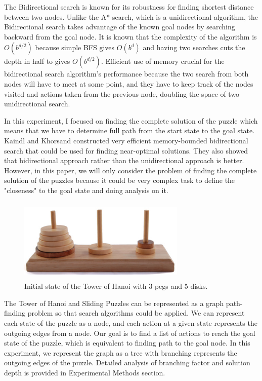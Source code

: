 \documentclass[conference]{IEEEtran}
\begin{document}
The Bidirectional search is known for its robustness for finding shortest distance between two nodes. Unlike the A* search, which is a unidirectional algorithm, the Bidirectional search takes advantage of the known goal nodes by searching backward from the goal node. It is known that the complexity of the algorithm is $O(b^{d/2})$ because simple BFS gives $O(b^d)$ and having two searches cuts the depth in half to gives $O(b^{d/2})$. Efficient use of memory crucial for the bidirectional search algorithm's performance because the two search from both nodes will have to meet at some point, and they have to keep track of the nodes visited and actions taken from the previous node, doubling the space of two unidirectional search.

In this experiment, I focused on finding the complete solution of the puzzle which means that we have to determine full path from the start state to the goal state. Kaindl and Khorsand constructed very efficient memory-bounded bidirectional search that could be used for finding near-optimal solutions. They also showed that bidirectional approach rather than the unidirectional approach is better. \cite{KandKh} However, in this paper, we will only consider the problem of finding the complete solution of the puzzles because it could be very complex task to define the "closeness" to the goal state and doing analysis on it.

\begin{figure}[!t]
\includegraphics[width=8cm, height=4cm]{towerofhanoi}
\centering
\caption{Initial state of the Tower of Hanoi with 3 pegs and 5 disks.}
\end{figure}

The Tower of Hanoi and Sliding Puzzles can be represented as a graph path-finding problem so that search algorithms could be applied. We can represent each state of the puzzle as a node, and each action at a given state represents the outgoing edges from a node. Our goal is to find a list of actions to reach the goal state of the puzzle, which is equivalent to finding path to the goal node. In this experiment, we represent the graph as a tree with branching represents the outgoing edges of the puzzle. Detailed analysis of branching factor and solution depth is provided in Experimental Methods section.
\end{document}
